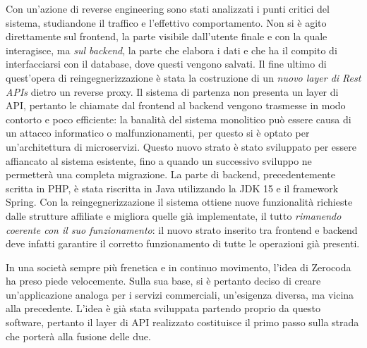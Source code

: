 \documentclass[
    corpo=11pt,
    twoside,
]{toptesi}
\begin{document}
Con un'azione di reverse engineering sono stati analizzati i punti critici del sistema, studiandone il traffico e l'effettivo comportamento. Non si è agito direttamente sul frontend, la parte visibile dall'utente finale e con la quale interagisce, ma \textit{sul backend}, la parte che elabora i dati e che ha il compito di interfacciarsi con il database, dove questi vengono salvati. Il fine ultimo di quest'opera di reingegnerizzazione è stata la costruzione di un \emph{nuovo layer di Rest APIs} dietro un reverse proxy. Il sistema di partenza non presenta un layer di API, pertanto le chiamate dal frontend al backend vengono trasmesse in modo contorto e poco efficiente: la banalità del sistema monolitico può essere causa di un attacco informatico o malfunzionamenti, per questo si è optato per un'architettura di microservizi. Questo nuovo strato è stato sviluppato per essere affiancato al sistema esistente, fino a quando un successivo sviluppo ne permetterà una completa migrazione. La parte di backend, precedentemente scritta in PHP, è stata riscritta in Java utilizzando la JDK 15 e il framework Spring. Con la reingegnerizzazione il sistema ottiene nuove funzionalità richieste dalle strutture affiliate e migliora quelle già implementate, il tutto \emph{rimanendo coerente con il suo funzionamento}: il nuovo strato inserito tra frontend e backend deve infatti garantire il corretto funzionamento di tutte le operazioni già presenti.

In una società sempre più frenetica e in continuo movimento, l'idea di Zerocoda ha preso piede velocemente. Sulla sua base, si è pertanto deciso di creare un'applicazione analoga per i servizi commerciali, un'esigenza  diversa, ma vicina alla precedente. L'idea è già stata sviluppata partendo proprio da questo software, pertanto il layer di API realizzato costituisce il primo passo sulla strada che porterà alla fusione delle due.


\tableofcontents

\listoffigures



\mainmatter










{}
\nocite{*}
\printbibliography
\end{document}
